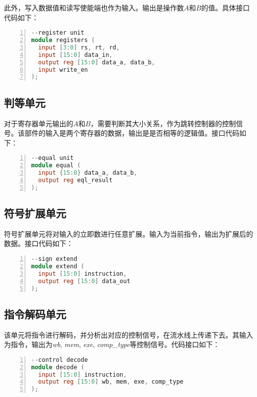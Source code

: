 此外，写入数据值和读写使能端也作为输入。输出是操作数$A$和$B$的值。具体接口代码如下：

\begin{lstlisting}[language=verilog,frame=single,breaklines,breaklines,basicstyle=\footnotesize\ttfamily,numbers=left]
--register unit
module registers (
  input [3:0] rs, rt, rd,
  input [15:0] data_in,
  output reg [15:0] data_a, data_b,
  input write_en
);
\end{lstlisting}

\subsection{判等单元}
对于寄存器单元输出的$A$和$B$，需要判断其大小关系，作为跳转控制器的控制信号。该部件的输入是两个寄存器的数据，输出是是否相等的逻辑值。接口代码如下：

\begin{lstlisting}[language=verilog,frame=single,breaklines,breaklines,basicstyle=\footnotesize\ttfamily,numbers=left]
--equal unit
module equal (
  input {15:0} data_a, data_b,
  output reg eql_result
);
\end{lstlisting}

\subsection{符号扩展单元}
符号扩展单元将对输入的立即数进行任意扩展。输入为当前指令，输出为扩展后的数据。接口代码如下：

\begin{lstlisting}[language=verilog,frame=single,breaklines,breaklines,basicstyle=\footnotesize\ttfamily,numbers=left]
--sign extend
module extend (
  input [15:0] instruction,
  output reg [15:0] data_out
);
\end{lstlisting}

\subsection{指令解码单元}
该单元将指令进行解码，并分析出对应的控制信号，在流水线上传递下去。其输入为指令，输出为\emph{wb}, \emph{mem}, \emph{exe}, \emph{comp\_type}等控制信号。代码接口如下：

\begin{lstlisting}[language=verilog,frame=single,breaklines,breaklines,basicstyle=\footnotesize\ttfamily,numbers=left]
--control decode
module decode (
  input [15:0] instruction,
  output reg [15:0] wb, mem, exe, comp_type
);
\end{lstlisting}


